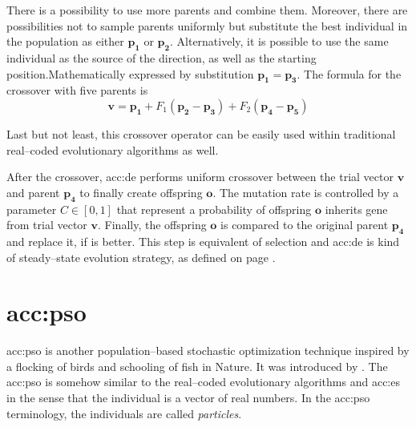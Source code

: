 There is a possibility to use more parents and combine them. Moreover, there are possibilities not to sample parents uniformly but substitute the best individual in the population as either $\mathbf{p_1}$ or $\mathbf{p_2}$. Alternatively, it is possible to use the same individual as the source of the direction, as well as the starting position.Mathematically expressed by substitution $\mathbf{p_1} = \mathbf{p_3}$. The formula for the crossover with five parents is
$$
\mathbf{v} = \mathbf{p_1} + F_1\left( \mathbf{p_2} - \mathbf{p_3} \right) + F_2\left( \mathbf{p_4} - \mathbf{p_5} \right)
$$

Last but not least, this crossover operator can be easily used within traditional real--coded evolutionary algorithms as well.

After the crossover, \acrshort{acc:de} performs uniform crossover between the trial vector $\mathbf{v}$ and parent $\mathbf{p_4}$ to finally create offspring $\mathbf{o}$. The mutation rate is controlled by a parameter $C\in\left[0,1\right]$ that represent a probability of offspring $\mathbf{o}$ inherits gene from trial vector $\mathbf{v}$. Finally, the offspring $\mathbf{o}$ is compared to the original parent $\mathbf{p_4}$ and replace it, if is better. This step is equivalent of selection and \acrshort{acc:de} is kind of steady--state evolution strategy, as defined on page \pageref{enum:steadystate}.




\section{\texorpdfstring{\acrlong*{acc:pso}}{Particle Swarm Optimization}}

\acrfull{acc:pso} is another population--based stochastic optimization technique inspired by a flocking of birds and schooling of fish in Nature. It was introduced by \citet*{PSOOriginal}. The \acrshort{acc:pso} is somehow similar to the real--coded evolutionary algorithms and \acrshort{acc:es} in the sense that the individual is a vector of real numbers. In the \acrshort{acc:pso} terminology, the individuals are called \emph{particles}.

